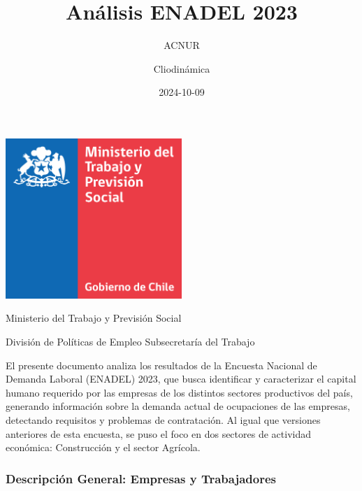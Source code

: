 \documentclass[
]{article}
\title{Análisis ENADEL 2023}
\subtitle{ACNUR}
\author{Cliodinámica}
\date{2024-10-09}
\begin{document}
\maketitle

\begin{titlingpage}
    \centering
    \includegraphics[width=0.5\textwidth]{Imagenes/color_MinTrabajo.png}
    \vspace{2cm} %

    \maketitle %

    \vspace{2cm} %
\end{titlingpage}

Ministerio del Trabajo y Previsión Social

División de Políticas de Empleo Subsecretaría del Trabajo

El presente documento analiza los resultados de la Encuesta Nacional de
Demanda Laboral (ENADEL) 2023, que busca identificar y caracterizar el
capital humano requerido por las empresas de los distintos sectores
productivos del país, generando información sobre la demanda actual de
ocupaciones de las empresas, detectando requisitos y problemas de
contratación. Al igual que versiones anteriores de esta encuesta, se
puso el foco en dos sectores de actividad económica: Construcción y el
sector Agrícola.

\tableofcontents

\newpage

\subsubsection{Descripción General: Empresas y
Trabajadores}\label{descripciuxf3n-general-empresas-y-trabajadores}
\end{document}
